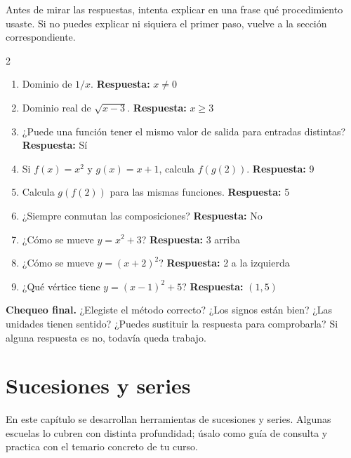 \documentclass[10pt,oneside,openany]{book}
\begin{document}
Antes de mirar las respuestas, intenta explicar en una frase qué procedimiento usaste. Si no puedes explicar ni siquiera el primer paso, vuelve a la sección correspondiente.

\begin{multicols}{2}\begin{enumerate}

\item Dominio de $1/x$. \textbf{Respuesta:} $x\neq0$

\item Dominio real de $\sqrt{x-3}$. \textbf{Respuesta:} $x\geq3$

\item ¿Puede una función tener el mismo valor de salida para entradas distintas? \textbf{Respuesta:} Sí

\item Si $f(x)=x^2$ y $g(x)=x+1$, calcula $f(g(2))$. \textbf{Respuesta:} 9

\item Calcula $g(f(2))$ para las mismas funciones. \textbf{Respuesta:} 5

\item ¿Siempre conmutan las composiciones? \textbf{Respuesta:} No

\item ¿Cómo se mueve $y=x^2+3$? \textbf{Respuesta:} 3 arriba

\item ¿Cómo se mueve $y=(x+2)^2$? \textbf{Respuesta:} 2 a la izquierda

\item ¿Qué vértice tiene $y=(x-1)^2+5$? \textbf{Respuesta:} $(1,5)$

\end{enumerate}\end{multicols}

\begin{idea}\textbf{Chequeo final.} ¿Elegiste el método correcto? ¿Los signos están bien? ¿Las unidades tienen sentido? ¿Puedes sustituir la respuesta para comprobarla? Si alguna respuesta es no, todavía queda trabajo.\end{idea}



\chapter{Sucesiones y series}

\begin{idea}
En este capítulo se desarrollan herramientas de sucesiones y series. Algunas escuelas lo cubren con distinta profundidad; úsalo como guía de consulta y practica con el temario concreto de tu curso.
\end{idea}
\end{document}
